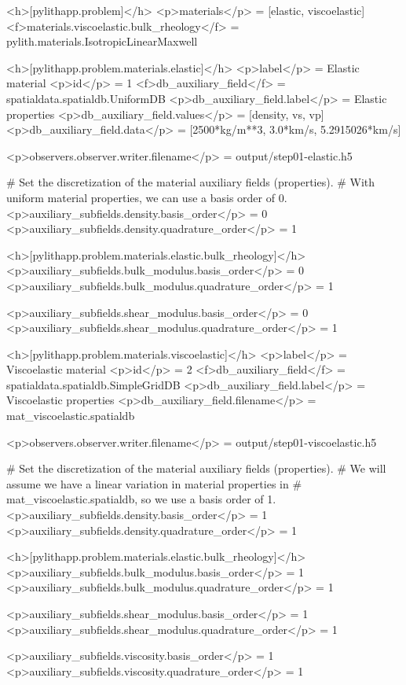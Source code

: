 \begin{cfg}
  <h>[pylithapp.problem]</h>
  <p>materials</p> = [elastic, viscoelastic]
  <f>materials.viscoelastic.bulk_rheology</f> = pylith.materials.IsotropicLinearMaxwell

    <h>[pylithapp.problem.materials.elastic]</h>
  <p>label</p> = Elastic material
  <p>id</p> = 1
  <f>db_auxiliary_field</f> = spatialdata.spatialdb.UniformDB
  <p>db_auxiliary_field.label</p> = Elastic properties
  <p>db_auxiliary_field.values</p> = [density, vs, vp]
  <p>db_auxiliary_field.data</p> = [2500*kg/m**3, 3.0*km/s, 5.2915026*km/s]

  <p>observers.observer.writer.filename</p> = output/step01-elastic.h5

  # Set the discretization of the material auxiliary fields (properties).
  # With uniform material properties, we can use a basis order of 0.
  <p>auxiliary_subfields.density.basis_order</p> = 0
  <p>auxiliary_subfields.density.quadrature_order</p> = 1

    <h>[pylithapp.problem.materials.elastic.bulk_rheology]</h>
  <p>auxiliary_subfields.bulk_modulus.basis_order</p> = 0
  <p>auxiliary_subfields.bulk_modulus.quadrature_order</p> = 1

  <p>auxiliary_subfields.shear_modulus.basis_order</p> = 0
  <p>auxiliary_subfields.shear_modulus.quadrature_order</p> = 1


    <h>[pylithapp.problem.materials.viscoelastic]</h>
  <p>label</p> = Viscoelastic material
  <p>id</p> = 2
  <f>db_auxiliary_field</f> = spatialdata.spatialdb.SimpleGridDB
  <p>db_auxiliary_field.label</p> = Viscoelastic properties
  <p>db_auxiliary_field.filename</p> = mat_viscoelastic.spatialdb

  <p>observers.observer.writer.filename</p> = output/step01-viscoelastic.h5

  # Set the discretization of the material auxiliary fields (properties).
  # We will assume we have a linear variation in material properties in
  # mat_viscoelastic.spatialdb, so we use a basis order of 1.
  <p>auxiliary_subfields.density.basis_order</p> = 1
  <p>auxiliary_subfields.density.quadrature_order</p> = 1

    <h>[pylithapp.problem.materials.elastic.bulk_rheology]</h>
  <p>auxiliary_subfields.bulk_modulus.basis_order</p> = 1
  <p>auxiliary_subfields.bulk_modulus.quadrature_order</p> = 1

  <p>auxiliary_subfields.shear_modulus.basis_order</p> = 1
  <p>auxiliary_subfields.shear_modulus.quadrature_order</p> = 1

  <p>auxiliary_subfields.viscosity.basis_order</p> = 1
  <p>auxiliary_subfields.viscosity.quadrature_order</p> = 1
\end{cfg}


